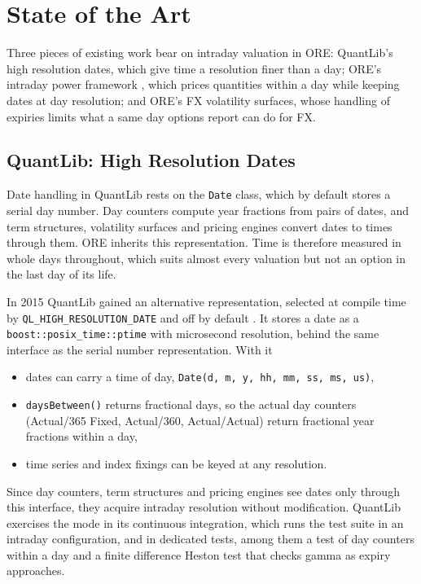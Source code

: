 \documentclass[12pt, a4paper]{article}
\begin{document}
\section{State of the Art}\label{sec:stateofart}

Three pieces of existing work bear on intraday valuation in ORE: QuantLib's high resolution dates, which give time a
resolution finer than a day; ORE's intraday power framework \cite{intradaypower}, which prices quantities within a day while keeping dates
at day resolution; and ORE's FX volatility surfaces, whose handling of expiries limits what a same day options report
can do for FX.

\subsection{QuantLib: High Resolution Dates}\label{sec:sota-ql}

Date handling in QuantLib \cite{quantlib} rests on the \texttt{Date} class, which by default stores a serial day
number. Day counters compute year fractions from pairs of dates, and term structures, volatility surfaces and pricing
engines convert dates to times through them. ORE \cite{ore} inherits this representation. Time is therefore measured in
whole days throughout, which suits almost every valuation but not an option in the last day of its life.

In 2015 QuantLib gained an alternative representation, selected at compile time by \texttt{QL\_HIGH\_RESOLUTION\_DATE}
and off by default \cite{qlhighres}. It stores a date as a \texttt{boost::posix\_time::ptime} with microsecond
resolution, behind the same interface as the serial number representation. With it

\begin{itemize}
\item dates can carry a time of day, \texttt{Date(d, m, y, hh, mm, ss, ms, us)},
\item \texttt{daysBetween()} returns fractional days, so the actual day counters (Actual/365 Fixed, Actual/360,
  Actual/Actual) return fractional year fractions within a day,
\item time series and index fixings can be keyed at any resolution.
\end{itemize}

Since day counters, term structures and pricing engines see dates only through this interface, they acquire intraday
resolution without modification. QuantLib exercises the mode in its continuous integration, which runs the test suite
in an intraday configuration, and in dedicated tests, among them a test of day counters within a day and a finite
difference Heston test that checks gamma as expiry approaches.
\end{document}
